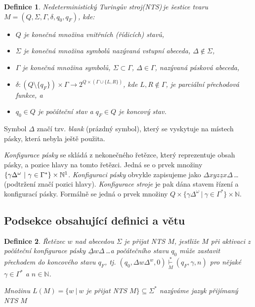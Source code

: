 \documentclass[twocolumn,a4paper,11pt,draft]{article}
\newtheorem{definition}{Definice}
\theoremstyle{definition}
\begin{document}
	\begin{definition}
		\label{def1}
		\textnormal{Nedeterministický Turingův stroj}(NTS)\,je šestice tvaru $M=(Q,\Sigma,\Gamma,\delta,q_0,q_F)$, kde:
		\begin{itemize}
		 \item $Q$ je konečná množina \textnormal{vnitřních (řídicích) stavů},
		 \item $\Sigma$ je konečná množina symbolů nazývaná \textnormal{vstupní abeceda}, $\Delta \notin \Sigma$,
		 \item $\Gamma$ je konečná množina symbolů, $\Sigma \subset \Gamma$, $\Delta \in \Gamma$, nazývaná \textnormal{pásková abeceda},
		 \item $\delta: (Q \setminus \{q_F\}) \times \Gamma \rightarrow 2^{Q \times (\Gamma \cup \{L,R\})}$, kde $L, R \notin \Gamma$, je parciální \textnormal{přechodová funkce,} a
		 \item $q_0 \in Q$ je \textnormal{počáteční stav} a $q_F \in Q$ je \textnormal{koncový stav}.
		\end{itemize}
	\end{definition}

	Symbol $\Delta$ značí tzv. \emph{blank} (prázdný symbol), který se vyskytuje na místech pásky, která nebyla ještě použita.

	\emph{Konfigurace pásky} se skládá z nekonečného řetězce, který reprezentuje obsah pásky, a pozice hlavy na tomto řetězci. Jedná se o prvek množiny \mbox{$\{\gamma\Delta^{\omega}\ |\ \gamma \in \Gamma^*\} \times \mathbb{N}\footnotemark$.}
	\emph{Konfiguraci pásky} obvykle zapisujeme jako $\Delta xyz\underline{z}x\Delta$\,\ldots (podtržení značí pozici hlavy).
	\emph{Konfigurace stroje} je pak dána stavem řízení a konfigurací pásky. Formálně se jedná o prvek množiny \mbox{$Q \times \{\gamma\Delta^{\omega}\ |\ \gamma \in \Gamma^*\} \times \mathbb{N}$.}

	\subsection{Podsekce obsahující definici a větu}
	\begin{definition}
	\label{def2}
	\textnormal{Řetězec} $w$ \textnormal{nad abecedou $\Sigma$ je přijat NTS} $M$, jestliže $M$ při aktivaci z počáteční konfigurace pásky $\underline{\Delta}w\Delta$\,\ldots a počátečního stavu $q_0$ může zastavit přechodem do koncového stavu $q_F$, tj. $(q_0,\Delta w \Delta^w, 0) \stackrel{*}{\underset{M}{\vdash}} (q_F, \gamma, n)$ pro nějaké $\gamma \in \Gamma^*$ a $n \in \mathbb{N}$.
	
	Množinu $L(M) = \{w\ |\ w$ je přijat NTS $M \} \subseteq \Sigma^*$ nazýváme \textnormal{jazyk přijímaný NTS} $M$
	\end{definition}
\end{document}
